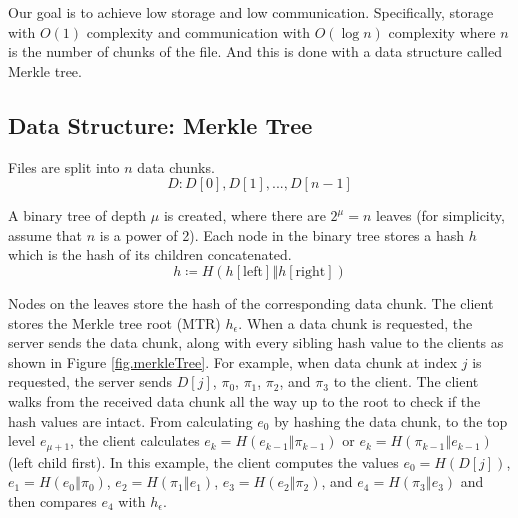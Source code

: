 Our goal is to achieve low storage and low communication. Specifically, storage with $O(1)$ complexity and communication with $O(\log n)$ complexity where $n$ is the number of chunks of the file. And this is done with a data structure called Merkle tree.

\subsection{Data Structure: Merkle Tree}

Files are split into $n$ data chunks.
$$
D: D[0], D[1], ..., D[n-1]
$$

A binary tree of depth $\mu$ is created, where there are $2^\mu = n$ leaves (for simplicity, assume that $n$ is a power of 2). Each node in the binary tree stores a hash $h$ which is the hash of its children concatenated.
$$
h \coloneqq H(h[\mathrm{left}] \mathbin\Vert h[\mathrm{right}])
$$

Nodes on the leaves store the hash of the corresponding data chunk. The client stores the Merkle tree root (MTR) $h_\epsilon$. When a data chunk is requested, the server sends the data chunk, along with every sibling hash value to the clients as shown in Figure \ref{fig.merkleTree}. For example, when data chunk at index $j$ is requested, the server sends $D[j]$, $\pi_0$, $\pi_1$, $\pi_2$, and $\pi_3$ to the client. The client walks from the received data chunk all the way up to the root to check if the hash values are intact. From calculating $e_0$ by hashing the data chunk, to the top level $e_{\mu+1}$, the client calculates $e_k = H(e_{k-1} \mathbin\Vert \pi_{k-1})$ or $e_k = H(\pi_{k-1} \mathbin\Vert e_{k-1})$(left child first). In this example, the client computes the values $e_0 = H(D[j])$, $e_1 = H(e_0 \mathbin\Vert \pi_0)$, $e_2 = H(\pi_1 \mathbin\Vert e_1)$, $e_3 = H(e_2 \mathbin\Vert \pi_2)$, and $e_4 = H(\pi_3 \mathbin\Vert e_3)$ and then compares $e_4$ with $h_\epsilon$.


